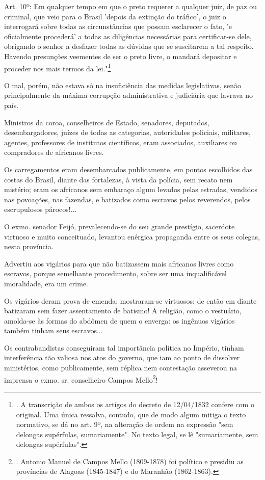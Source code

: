 Art. 10º: Em qualquer tempo em que o preto requerer a qualquer juiz, de
paz ou criminal, que veio para o Brasil 'depois da extinção do tráfico',
o juiz o interrogará sobre todas as circunstâncias que possam esclarecer
o fato, 'e oficialmente procederá' a todas as diligências necessárias
para certificar-se dele, obrigando o senhor a desfazer todas as dúvidas
que se suscitarem a tal respeito. Havendo presunções veementes de ser o
preto livre, o mandará depositar e proceder nos mais termos da
lei."\footnote{. A transcrição de ambos os artigos do decreto de
  12/04/1832 confere com o original. Uma única ressalva, contudo, que de
  modo algum mitiga o texto normativo, se dá no art. 9º, na alteração de
  ordem na expressão "sem delongas supérfulas, sumariamente". No texto
  legal, se lê "sumariamente, sem delongas supérfulas".}

O mal, porém, não estava só na insuficiência das medidas legislativas,
senão principalmente da máxima corrupção administrativa e judiciária que
lavrava no país.

Ministros da coroa, conselheiros de Estado, senadores, deputados,
desembargadores, juízes de todas as categorias, autoridades policiais,
militares, agentes, professores de institutos científicos, eram
associados, auxiliares ou compradores de africanos livres.

Os carregamentos eram desembarcados publicamente, em pontos escolhidos
das costas do Brasil, diante das fortalezas, à vista da polícia, sem
recato nem mistério; eram os africanos sem embaraço algum levados pelas
estradas, vendidos nas povoações, nas fazendas, e batizados como
escravos pelos reverendos, pelos escrupulosos párocos!...

O exmo. senador Feijó, prevalecendo-se do seu grande prestígio,
sacerdote virtuoso e muito conceituado, levantou enérgica propaganda
entre os seus colegas, nesta província.

Advertiu aos vigários para que não batizassem mais africanos livres como
escravos, porque semelhante procedimento, sobre ser uma inqualificável
imoralidade, era um crime.

Os vigários deram prova de emenda; mostraram-se virtuosos: de então em
diante batizaram sem fazer assentamento de batismo! A religião, como o
vestuário, amolda-se às formas do abdômen de quem o enverga: os ingênuos
vigários também tinham seus escravos...

Os contrabandistas conseguiram tal importância política no Império,
tinham interferência tão valiosa nos atos do governo, que iam ao ponto
de dissolver ministérios, como publicamente, sem réplica nem contestação
asseverou na imprensa o exmo. sr. conselheiro Campos Mello\footnote{.
  Antonio Manuel de Campos Mello (1809-1878) foi político e presidiu as
  províncias de Alagoas (1845-1847) e do Maranhão (1862-1863).}!

